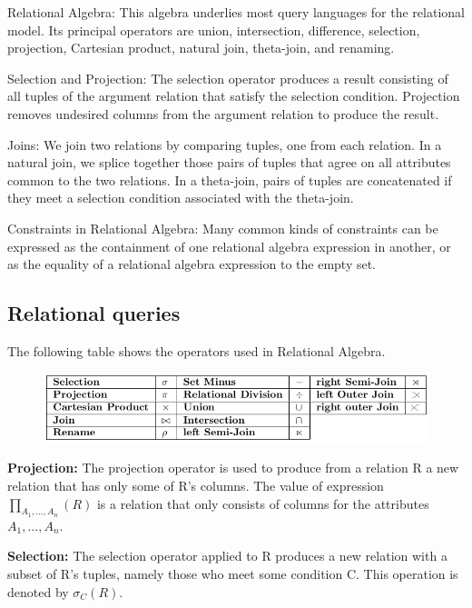 \documentclass[11pt,oneside,a4paper]{article}
\begin{document}
\begin{compactitem}
	\item Relational Algebra: This algebra underlies most query languages for the relational model. Its principal operators are union, intersection, difference, selection, projection, Cartesian product, natural join, theta-join, and renaming.
	\item Selection and Projection: The selection operator produces a result consisting of all tuples of the argument relation that satisfy the selection condition. Projection removes undesired columns from the argument relation to produce the result.
	\item Joins: We join two relations by comparing tuples, one from each relation.	In a natural join, we splice together those pairs of tuples that agree on all attributes common to the two relations. In a theta-join, pairs of tuples are concatenated if they meet a selection condition associated with the theta-join.
	\item Constraints in Relational Algebra: Many common kinds of constraints can be expressed as the containment of one relational algebra expression in another, or as the equality of a relational algebra expression to the empty set.
\end{compactitem}

\subsection{Relational queries}

The following table shows the operators used in Relational Algebra.

\vspace{-\topsep}
\begin{figure}[hb]
	\centering
	\includegraphics[width=0.7\linewidth]{figures/relational_algebra_operators}
	\label{fig:relationalalgebraoperators}
\end{figure}
\vspace{-\topsep}

\textbf{Projection:} The projection operator is used to produce from a relation R a new relation that has only some of R’s columns. The value of expression $\prod_{A_1,...,A_n}(R)$ is a relation that only
consists of columns for the attributes $A_1,...,A_n$.

\textbf{Selection:} The selection operator applied to R produces a new relation with a subset of R’s tuples, namely those who meet some condition C. This operation is denoted by $\sigma_C(R)$.
\end{document}
